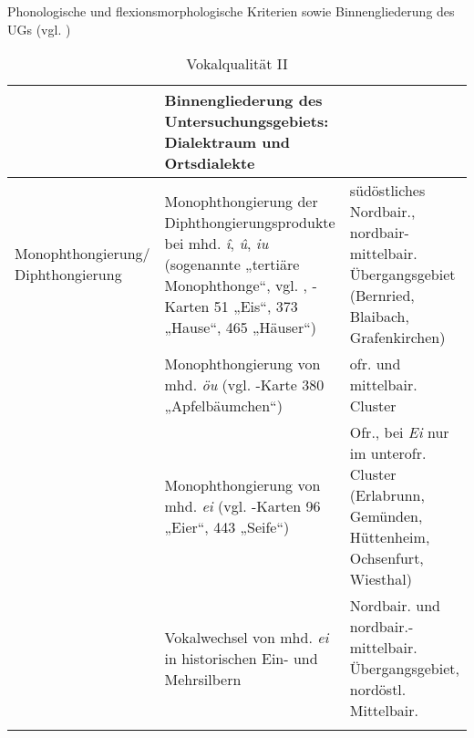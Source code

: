 \begin{table}
\ContinuedFloat
\caption{Phonologische und flexionsmorphologische Kriterien sowie Binnengliederung des UGs (vgl. \citealt[4--5]{Rowley1997})}

\begin{subtable}{\textwidth}
\caption{Vokalqualität II}
\label{tab:12b}
\small
\begin{tabularx}{\textwidth}{>{\raggedright\arraybackslash}p{}QQ}
\lsptoprule

 & Binnengliederung des Untersuchungs\-gebiets: Dialektraum und Ortsdialekte\\
\midrule
Monophthongierung/ Diphthongier\-ung & Monophthongierung der Diphthongierungsprodukte bei mhd. \textit{î}, \textit{û}, \textit{iu} (sogenannte „tertiäre Monophthonge“, vgl. \citealt{Wildfeuer2004}, \citealt{WA}-Karten 51 „Eis“, 373 „Hause“, 465 „Häuser“) & südöstliches Nordbair., nordbair-mittelbair. Übergangsgebiet (Bernried, Blaibach, Grafenkirchen)\\
\tablevspace
& Monophthongierung von mhd. \textit{öu} (vgl. \citealt{WA}-Karte 380 „Apfelbäumchen“) & ofr. und mittelbair. Cluster \\
\tablevspace
& Monophthongierung von mhd. \textit{ei} (vgl. \citealt{WA}-Karten 96 „Eier“, 443 „Seife“) & Ofr., bei \textit{Ei} nur im unterofr. Cluster (Erlabrunn, Gemünden, Hüttenheim, Ochsenfurt, Wiesthal)\\
\tablevspace
& Vokalwechsel von mhd. \textit{ei} in historischen Ein- und Mehrsilbern & Nordbair. und nordbair.-mittelbair. Über\-gangsgebiet, nordöstl. Mittelbair.\\
\lspbottomrule
\end{tabularx}
\end{subtable}
\end{table}


